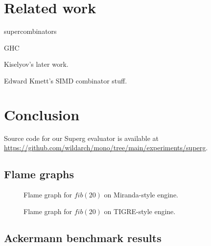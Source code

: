 \documentclass[conference]{IEEEtran}
\begin{document}
\section{Related work}
supercombinators

GHC

Kiselyov's later work.

Edward Kmett's SIMD combinator stuff.

\section{Conclusion}

Source code for our Superg evaluator is available at \url{https://github.com/wildarch/mono/tree/main/experiments/superg}.








\appendix

\subsection{Flame graphs}
\label{app:flame-graph}
\begin{figure}
    
    \centering
    \caption{Flame graph for $fib(20)$ on Miranda-style engine.}
    \label{fig:flamegraph-turner}
\end{figure}

\begin{figure}
    
    \centering
    \caption{Flame graph for $fib(20)$ on TIGRE-style engine.}
    \label{fig:flamegraph-tigre}
\end{figure}

\newpage

\subsection{Ackermann benchmark results}
\label{app:ack}
\end{document}
